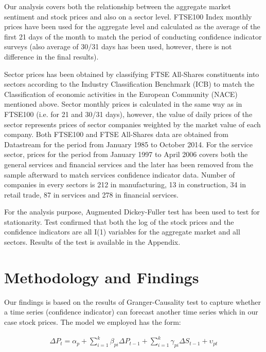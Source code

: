 \documentclass[12pt]{article}																																															%
\begin{document}
Our analysis covers both the relationship between the aggregate market sentiment and stock prices and also on a sector level. FTSE100 Index monthly prices have been used for the aggregate level and calculated as the average of the first 21 days of the month to match the period of conducting confidence indicator surveys (also average of 30/31 days has been used, however, there is not difference in the final results). 

\par Sector prices has been obtained by classifying FTSE All-Shares constituents into sectors according to the Industry Classification Benchmark (ICB) to match the Classification of economic activities in the European Community (NACE) mentioned above. Sector monthly prices is calculated in the same way as in FTSE100 (i.e. for 21 and 30/31 days), however, the value of daily prices of the sector represents prices of sector companies weighted by the market value of each company. Both FTSE100 and FTSE All-Shares data are obtained from Datastream for the period from January 1985 to October 2014.  For the service sector, prices for the period from January 1997 to April 2006 covers both the general services and financial services and the later has been removed from the sample afterward to match services confidence indicator data. Number of companies in every sectors is 212 in manufacturing, 13 in construction, 34 in retail trade, 87 in services and 278 in financial services. 

\par For the analysis purpose, Augmented Dickey-Fuller test has been used to test for stationarity. Test confirmed that both the log of the stock prices and the confidence indicators are all I(1) variables for the aggregate market and all sectors. Results of the test is available in the Appendix.

\section{Methodology and Findings}

Our findings is based on the results of Granger-Causality test to capture whether a time series (confidence indicator) can forecast another time series which in our case stock prices. The model we employed has the form:

 \begin{equation*} \label{eq1}
\begin{split}
\Delta P_t= \alpha_{p} + \sum_{i=1}^{k} \beta_{pi} \Delta P_{t-1}+ \sum_{i=1}^{k} \gamma_{pi} \Delta S_{t-1}+ \upsilon_{pt} 
\end{split}
\end{equation*}
\end{document}
